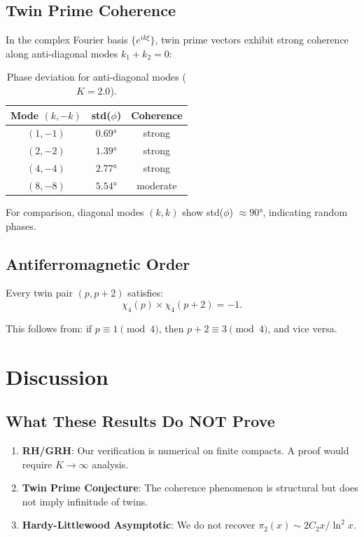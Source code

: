 \documentclass[11pt,a4paper]{article}
\theoremstyle{definition}
\begin{document}
\subsection{Twin Prime Coherence}

In the complex Fourier basis $\{e^{ik\xi}\}$, twin prime vectors exhibit strong coherence along anti-diagonal modes $k_1 + k_2 = 0$:

\begin{table}[h]
\centering
\caption{Phase deviation for anti-diagonal modes ($K = 2.0$).}
\begin{tabular}{ccc}
\toprule
Mode $(k, -k)$ & std($\phi$) & Coherence \\
\midrule
$(1, -1)$ & $0.69°$ & strong \\
$(2, -2)$ & $1.39°$ & strong \\
$(4, -4)$ & $2.77°$ & strong \\
$(8, -8)$ & $5.54°$ & moderate \\
\bottomrule
\end{tabular}
\end{table}

For comparison, diagonal modes $(k, k)$ show std($\phi$) $\approx 90°$, indicating random phases.

\subsection{Antiferromagnetic Order}

Every twin pair $(p, p+2)$ satisfies:
\begin{equation}
\chi_4(p) \times \chi_4(p+2) = -1.
\end{equation}

This follows from: if $p \equiv 1 \pmod{4}$, then $p+2 \equiv 3 \pmod{4}$, and vice versa.

\section{Discussion}

\subsection{What These Results Do NOT Prove}

\begin{enumerate}
    \item \textbf{RH/GRH}: Our verification is numerical on finite compacts. A proof would require $K \to \infty$ analysis.
    \item \textbf{Twin Prime Conjecture}: The coherence phenomenon is structural but does not imply infinitude of twins.
    \item \textbf{Hardy-Littlewood Asymptotic}: We do not recover $\pi_2(x) \sim 2C_2 x/\ln^2 x$.
\end{enumerate}
\end{document}
